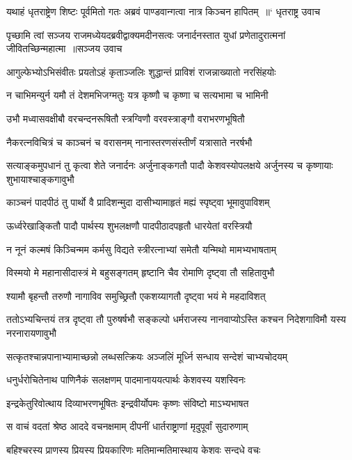 \threelineshloka
{यथाहं धृतराष्ट्रेण शिष्टः पूर्वमितो गतः}
{अब्रवं पाण्डवान्गत्वा नात्र किञ्चन हापितम् ॥` धृतराष्ट्र उवाच}
{}


\threelineshloka
{पृच्छामि त्वां सञ्जय राजमध्येयदब्रवीद्वाक्यमदीनसत्वः}
{जनार्दनस्तात युधां प्रणेतादुरात्मनां जीवितच्छिन्महात्मा ॥सञ्जय उवाच}
{}


\twolineshloka
{आगुल्फेभ्योऽभिसंवीतः प्रयतोऽहं कृताञ्जलिः}
{शुद्धान्तं प्राविशं राजन्नाख्यातो नरसिंहयोः}


\twolineshloka
{न चाभिमन्युर्न यमौ तं देशमभिजग्मतुः}
{यत्र कृष्णौ च कृष्णा च सत्यभामा च भामिनी}


\twolineshloka
{उभौ मध्वासवक्षीबौ वरचन्दनरूषितौ}
{स्त्रग्विणौ वरवस्त्राङ्गौ वराभरणभूषितौ}


\twolineshloka
{नैकरत्नविचित्रं च काञ्चनं च वरासनम्}
{नानास्तरणसंस्तीर्णं यत्रासाते नरर्षभौ}


\threelineshloka
{सत्याङ्कमुपधानं तु कृत्वा शेते जनार्दनः}
{अर्जुनाङ्कगतौ पादौ केशवस्योपलक्षये}
{अर्जुनस्य च कृष्णायाः शुभायाश्चाङ्कगावुभौ}


\twolineshloka
{काञ्चनं पादपीठं तु पार्थो वै प्रादिशन्मुदा}
{दासीभ्यामाहृतं मह्यं स्पृष्ट्वा भूमावुपाविशम्}


\twolineshloka
{ऊर्ध्वरेखाङ्कितौ पादौ पार्थस्य शुभलक्षणौ}
{पादपीठादपहृतौ धारयेतां वरस्त्रियौ}


\twolineshloka
{न नूनं कल्मषं किञ्चिन्मम कर्मसु विद्यते}
{स्त्रीरत्नाभ्यां समेतौ यन्मिथो मामभ्यभाषताम्}


\twolineshloka
{विस्मयो मे महानासीदास्त्रं मे बहुसङ्गतम्}
{हृष्टानि चैव रोमाणि दृष्ट्वा तौ सहितावुभौ}


\twolineshloka
{श्यामौ बृहन्तौ तरुणौ नागाविव समुच्छ्रितौ}
{एकशय्यागतौ दृष्ट्वा भयं मे महदाविशत्}


\threelineshloka
{ततोऽभ्यचिन्तयं तत्र दृष्ट्वा तौ पुरुषर्षभौ}
{सङ्कल्पो धर्मराजस्य नानवाप्योऽस्ति कश्चन}
{निदेशगाविमौ यस्य नरनारायणावुभौ}


\twolineshloka
{सत्कृतश्चान्नपानाभ्यामाच्छन्नो लब्धसत्क्रियः}
{अञ्जलिं मूर्ध्नि सन्धाय सन्देशं चाभ्यचोदयम्}


\twolineshloka
{धनुर्धरोचितेनाथ पाणिनैकं सलक्षणम्}
{पादमानाययत्पार्थः केशवस्य यशस्विनः}


\twolineshloka
{इन्द्रकेतुरिवोत्थाय दिव्याभरणभूषितः}
{इन्द्रवीर्योपमः कृष्णः संविष्टो माऽभ्यभाषत}


\twolineshloka
{स वाचं वदतां श्रेष्ठ आददे वचनक्षमाम्}
{दीपनीं धार्तराष्ट्राणां मृदुपूर्वां सुदारुणाम्}


\twolineshloka
{बहिश्चरस्य प्राणस्य प्रियस्य प्रियकारिणः}
{मतिमान्मतिमास्थाय केशवः सन्दधे वचः}



